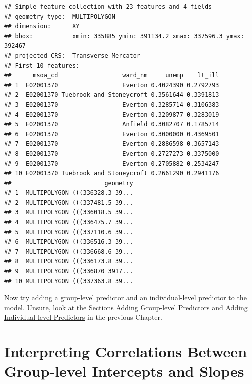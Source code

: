 \documentclass[
]{book}
\newenvironment{Shaded}{\begin{snugshade}}{\end{snugshade}}
\newcommand{\KeywordTok}[1]{\textcolor[rgb]{0.13,0.29,0.53}{\textbf{#1}}}
\newcommand{\NormalTok}[1]{#1}
\newcommand{\OperatorTok}[1]{\textcolor[rgb]{0.81,0.36,0.00}{\textbf{#1}}}
\newcommand{\StringTok}[1]{\textcolor[rgb]{0.31,0.60,0.02}{#1}}
\begin{document}
\begin{Shaded}
\end{Shaded}

\begin{verbatim}
## Simple feature collection with 23 features and 4 fields
## geometry type:  MULTIPOLYGON
## dimension:      XY
## bbox:           xmin: 335885 ymin: 391134.2 xmax: 337596.3 ymax: 392467
## projected CRS:  Transverse_Mercator
## First 10 features:
##      msoa_cd                  ward_nm     unemp    lt_ill
## 1  E02001370                  Everton 0.4024390 0.2792793
## 2  E02001370 Tuebrook and Stoneycroft 0.3561644 0.3391813
## 3  E02001370                  Everton 0.3285714 0.3106383
## 4  E02001370                  Everton 0.3209877 0.3283019
## 5  E02001370                  Anfield 0.3082707 0.1785714
## 6  E02001370                  Everton 0.3000000 0.4369501
## 7  E02001370                  Everton 0.2886598 0.3657143
## 8  E02001370                  Everton 0.2727273 0.3375000
## 9  E02001370                  Everton 0.2705882 0.2534247
## 10 E02001370 Tuebrook and Stoneycroft 0.2661290 0.2941176
##                          geometry
## 1  MULTIPOLYGON (((336328.3 39...
## 2  MULTIPOLYGON (((337481.5 39...
## 3  MULTIPOLYGON (((336018.5 39...
## 4  MULTIPOLYGON (((336475.7 39...
## 5  MULTIPOLYGON (((337110.6 39...
## 6  MULTIPOLYGON (((336516.3 39...
## 7  MULTIPOLYGON (((336668.6 39...
## 8  MULTIPOLYGON (((336173.8 39...
## 9  MULTIPOLYGON (((336870 3917...
## 10 MULTIPOLYGON (((337363.8 39...
\end{verbatim}

Now try adding a group-level predictor and an individual-level predictor to the model. Unsure, look at the Sections \protect\hyperlink{adding-group-level-predictors}{Adding Group-level Predictors} and \protect\hyperlink{adding-individual-level-predictors}{Adding Individual-level Predictors} in the previous Chapter.

\hypertarget{interpreting-correlations-between-group-level-intercepts-and-slopes}{%
\section{Interpreting Correlations Between Group-level Intercepts and Slopes}\label{interpreting-correlations-between-group-level-intercepts-and-slopes}}
\end{document}
